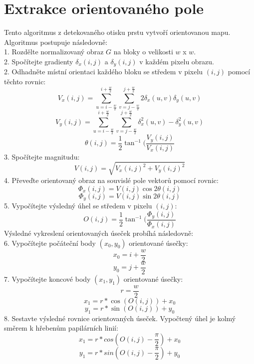 \section{Extrakce orientovaného pole}
Tento algoritmus z detekovaného otisku prstu vytvoří orientovanou mapu. Algoritmus postupuje následovně:\\
1. Rozdělte normalizovaný obraz $G$ na bloky o velikosti $w$ x $w$.\\
2. Spočítejte gradienty $\delta_x$$(i, j)$ a $\delta_y$$(i, j)$ v každém pixelu obrazu. \\
2. Odhadněte místní orientaci každého bloku se středem v pixelu $(i, j)$ pomocí těchto rovnic:
$$V_x(i, j) = \sum_{u=i-\frac{w}{2}}^{i+\frac{w}{2}}\sum_{v=j-\frac{w}{2}}^{j+\frac{w}{2}} 2\delta_x(u,v)\delta_y(u,v)$$
$$V_y(i, j) = \sum_{u=i-\frac{w}{2}}^{i+\frac{w}{2}}\sum_{v=j-\frac{w}{2}}^{j+\frac{w}{2}} \delta_x^2(u,v) - \delta_y^2(u,v)$$
$$\theta(i, j) = \frac{1}{2}\tan^{-1}(\frac{V_y(i,j)}{V_x(i, j)}$$
3. Spočítejte magnitudu:
$$V(i,j) = \sqrt{V_x(i,j)^2 + V_y(i,j)^2}$$
4. Převeďte orientovaný obraz na souvislé pole vektorů pomocí rovnic:
$$\Phi_x(i,j) = V(i,j)\cos{2\theta(i,j)}$$
$$\Phi_y(i,j) = V(i,j)\sin{2\theta(i,j)}$$
5. Vypočítejte výsledný úhel se středem v pixelu $(i, j)$:
$$O(i, j) = \frac{1}{2}\tan^{-1}(\frac{\Phi_y(i,j)}{\Phi_x(i, j)}$$
Výsledné vykreslení orientovaných úseček probíhá následovně:\\
6. Vypočítejte počáteční body $(x_0,y_0)$ orientované úsečky:\\
$$x_0 = i + \frac{w}{2}$$
$$y_0 = j + \frac{w}{2}$$
7. Vypočítejte koncové body $(x_1,y_1)$ orientované úsečky:\\
$$r = \frac{w}{2}$$
$$x_1 = r * \cos({O(i,j)})+ x_0$$
$$y_1 = r * \sin({O(i,j)})+ y_0$$
8. Sestavte výsledné rovnice orientovaných úseček. Vypočtený úhel je kolmý směrem k hřebenům papilárních linií:\\
$$x_1 = r * cos(O(i,j)- \frac{\pi}{2}) + x_0$$
$$y_1 = r * sin(O(i,j)- \frac{\pi}{2}) + y_0$$

